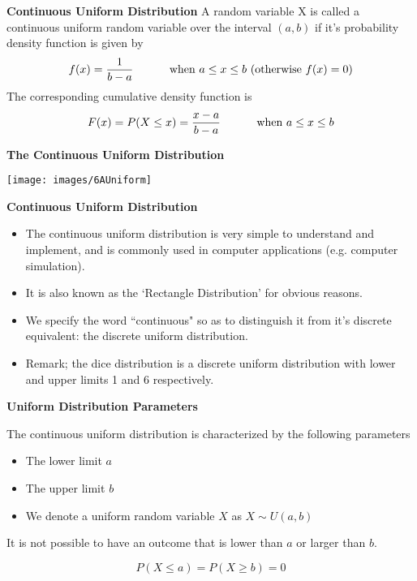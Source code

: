 
{
\textbf{Continuous Uniform Distribution}
A random variable X is called a continuous uniform random variable over the interval $(a,b)$ if it's probability density function is given by
\[ f(x) = { 1 \over b-a} \hspace{1cm} \mbox{ when } a \leq x \leq b \mbox{     (otherwise } f(x) = 0 ) \]
The corresponding cumulative density function is
\[ F(x) = P(X \leq x) = { x-a \over b-a} \hspace{1cm} \mbox{ when } a \leq x \leq b\]
}

\textbf{The Continuous Uniform Distribution}



\begin{center}
\texttt{[image: images/6AUniform]}

\end{center}
\medskip
{
\textbf{Continuous Uniform Distribution}
\begin{itemize}
\item The continuous uniform distribution is very simple to understand and implement, and is commonly used in computer applications (e.g. computer simulation).
\item It is also known as the `Rectangle Distribution' for obvious reasons.
\item We specify the word ``continuous" so as to distinguish it from it's discrete equivalent: the discrete uniform distribution.
\item Remark; the dice distribution is a discrete uniform distribution with lower and upper limits 1 and 6 respectively.
\end{itemize}
}
{
\textbf{Uniform Distribution Parameters}


The continuous uniform distribution is characterized by the following parameters

\begin{itemize}
\item The lower limit $a$
\item The upper limit $b$
\item We denote a uniform random variable $X$ as $X \sim U(a,b)$
\end{itemize}

It is not possible to have an outcome that is lower than $a$ or larger than $b$.

\[ P(X \leq a) = P(X \geq b) = 0\]
}

